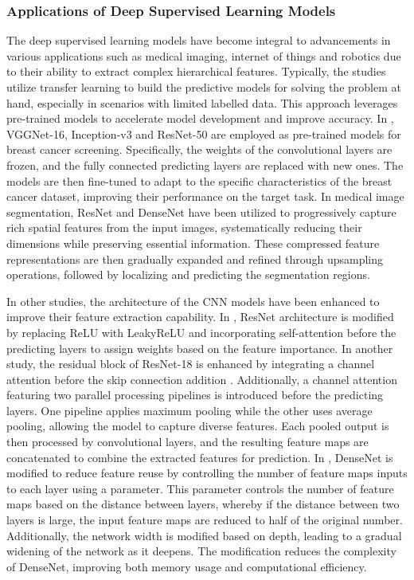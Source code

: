 \documentclass[preprint,12pt]{elsarticle}
\begin{document}
\subsubsection{Applications of Deep Supervised Learning Models}
The deep supervised learning models have become integral to advancements in various applications such as medical imaging, internet of things and robotics due to their ability to extract complex hierarchical features. Typically, the studies utilize transfer learning to build the predictive models for solving the problem at hand, especially in scenarios with limited labelled data. This approach leverages pre-trained models to accelerate model development and improve accuracy. In \citep{chougrad_deep_2018}, VGGNet-16, Inception-v3 and ResNet-50 are employed as pre-trained models for breast cancer screening. Specifically, the weights of the convolutional layers are frozen, and the fully connected predicting layers are replaced with new ones. The models are then fine-tuned to adapt to the specific characteristics of the breast cancer dataset, improving their performance on the target task. In medical image segmentation, ResNet \citep{zhao_novel_2020} and DenseNet \citep{cinar_hybrid_2022} have been utilized to progressively capture rich spatial features from the input images, systematically reducing their dimensions while preserving essential information. These compressed feature representations are then gradually expanded and refined through upsampling operations, followed by localizing and predicting the segmentation regions.

In other studies, the architecture of the CNN models have been enhanced to improve their feature extraction capability. In \citep{sun_self-attentional_2023}, ResNet architecture is modified by replacing ReLU with LeakyReLU and incorporating self-attention before the predicting layers to assign weights based on the feature importance. In another study, the residual block of ResNet-18 is enhanced by integrating a channel attention before the skip connection addition \citep{dong_improved_2023}. Additionally, a channel attention featuring two parallel processing pipelines is introduced before the predicting layers. One pipeline applies maximum pooling while the other uses average pooling, allowing the model to capture diverse features. Each pooled output is then processed by convolutional layers, and the resulting feature maps are concatenated to combine the extracted features for prediction. In \citep{hou_application_2024}, DenseNet is modified to reduce feature reuse by controlling the number of feature maps inputs to each layer using a parameter. This parameter controls the number of feature maps based on the distance between layers, whereby if the distance between two layers is large, the input feature maps are reduced to half of the original number. Additionally, the network width is modified based on depth, leading to a gradual widening of the network as it deepens. The modification reduces the complexity of DenseNet, improving both memory usage and computational efficiency.
\end{document}
